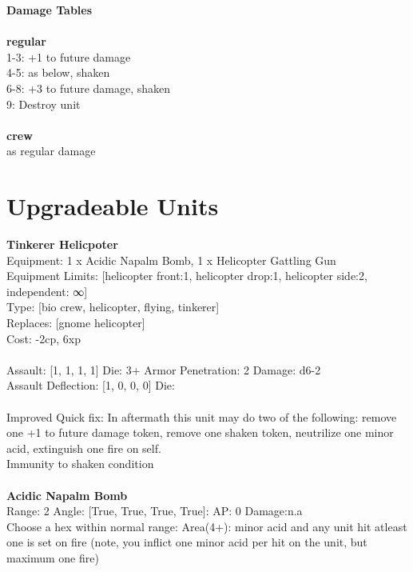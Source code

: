 {\bf Damage Tables} \\
\ \\ {\bf regular } \\
1-3: +1 to future damage \\
4-5: as below, shaken \\
6-8: +3 to future damage, shaken \\
9: Destroy unit \\
\ \\ {\bf crew } \\
as regular damage \\










\pagebreak\section{Upgradeable Units}{\bf Tinkerer Helicpoter } \\
Equipment: 1 x Acidic Napalm Bomb, 1 x Helicopter Gattling Gun \\
Equipment Limits: [helicopter front:1, helicopter drop:1, helicopter side:2, independent: ∞] \\
Type: [bio crew, helicopter, flying, tinkerer] \\
Replaces: [gnome helicopter] \\
Cost: -2cp, 6xp\\
\ \\
Assault: [1, 1, 1, 1] Die: 3+ Armor Penetration: 2 Damage: d6-2 \\
Assault Deflection: [1, 0, 0, 0] Die: \\
\indent  
\ \\
Improved Quick fix: In aftermath this unit may do two of the following: remove one +1 to future damage token, remove one shaken token, neutrilize one minor acid, extinguish one fire on self.\\ 
Immunity to shaken condition\\ 

\ \\
{\bf Acidic Napalm Bomb } \\



Range: 2  Angle: [True, True, True, True]: AP: 0 Damage:n.a \\
Choose a hex within normal range: Area(4+): minor acid and any unit hit atleast one is set on fire (note, you inflict one minor acid per hit on the unit, but maximum one fire)\\ 




